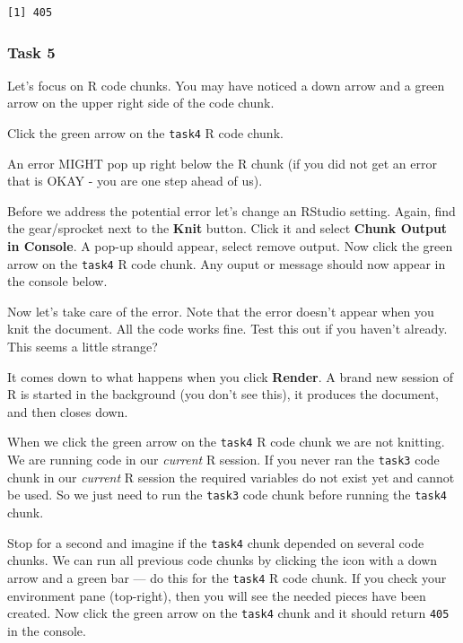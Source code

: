 \documentclass[
  letterpaper,
  DIV=11,
  numbers=noendperiod]{scrreprt}
\begin{document}
\begin{verbatim}
[1] 405
\end{verbatim}

\hypertarget{task-5}{%
\subsubsection*{Task 5}\label{task-5}}

Let's focus on R code chunks. You may have noticed a down arrow and a
green arrow on the upper right side of the code chunk.

Click the green arrow on the \texttt{task4} R code chunk.

An error MIGHT pop up right below the R chunk (if you did not get an
error that is OKAY - you are one step ahead of us).

Before we address the potential error let's change an RStudio setting.
Again, find the gear/sprocket next to the \textbf{Knit} button. Click it
and select \textbf{Chunk Output in Console}. A pop-up should appear,
select remove output. Now click the green arrow on the \texttt{task4} R
code chunk. Any ouput or message should now appear in the console below.

Now let's take care of the error. Note that the error doesn't appear
when you knit the document. All the code works fine. Test this out if
you haven't already. This seems a little strange?

It comes down to what happens when you click \textbf{Render}. A brand
new session of R is started in the background (you don't see this), it
produces the document, and then closes down.

When we click the green arrow on the \texttt{task4} R code chunk we are
not knitting. We are running code in our \emph{current} R session. If
you never ran the \texttt{task3} code chunk in our \emph{current} R
session the required variables do not exist yet and cannot be used. So
we just need to run the \texttt{task3} code chunk before running the
\texttt{task4} chunk.

Stop for a second and imagine if the \texttt{task4} chunk depended on
several code chunks. We can run all previous code chunks by clicking the
icon with a down arrow and a green bar --- do this for the
\texttt{task4} R code chunk. If you check your environment pane
(top-right), then you will see the needed pieces have been created. Now
click the green arrow on the \texttt{task4} chunk and it should return
\texttt{405} in the console.
\end{document}
